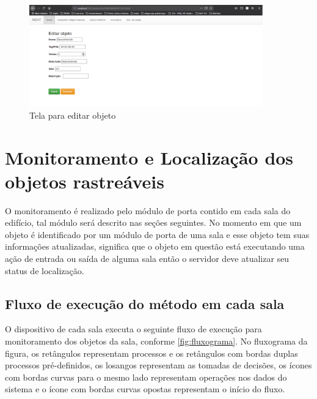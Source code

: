 \begin{figure}[H]
              \caption{\label{fig:tela_editar}Tela para editar objeto }
              \centering
              \includegraphics[width=0.9\textwidth]{Figuras/tela_editar.png}
\end{figure}


\section{Monitoramento e Localização dos objetos rastreáveis}

O monitoramento é realizado pelo módulo de porta contido em cada sala do edifício, tal módulo será descrito nas seções seguintes. No momento em que um objeto é identificado por um módulo de porta de uma sala e esse objeto tem suas informações atualizadas, significa que o objeto em questão está executando uma ação de entrada ou saída de alguma sala então o servidor deve atualizar seu status de localização.


\subsection{Fluxo de execução do método em cada sala}

O dispositivo de cada sala executa o seguinte fluxo de execução para monitoramento dos objetos da sala, conforme \autoref{fig:fluxograma}. 
No fluxograma da figura, os retângulos representam processos e os retângulos com bordas duplas processos pré-definidos, os losangos representam as tomadas de decisões,
os ícones com bordas curvas para o mesmo lado representam operações nos dados do sistema e o ícone com bordas curvas
opostas representam o início do fluxo.

